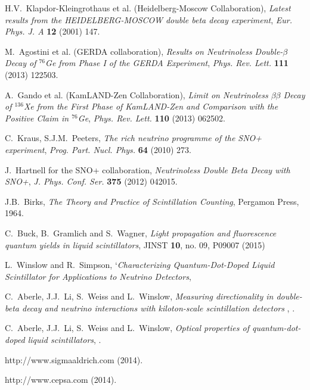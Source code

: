 \documentclass{JINST}
\begin{document}
\begin{thebibliography}{35}
H.V.~Klapdor-Kleingrothaus et al. (Heidelberg-Moscow Collaboration), \emph{Latest results from the HEIDELBERG-MOSCOW double beta decay experiment}, \emph{Eur. Phys. J. A} {\bf 12} (2001) 147.

M.~Agostini et al. (GERDA collaboration), \emph{Results on Neutrinoless Double-$\beta$ Decay of $^{76}$Ge from Phase I of the GERDA Experiment}, \emph{Phys. Rev. Lett.} {\bf 111} (2013) 122503. 

A.~Gando et al. (KamLAND-Zen Collaboration), \emph{Limit on Neutrinoless $\beta\beta$ Decay of $^{136}$Xe from the First Phase of KamLAND-Zen and Comparison with the Positive Claim in $^{76}$Ge}, \emph{Phys. Rev. Lett.} {\bf 110} (2013) 062502.

C.~Kraus, S.J.M.~Peeters, \emph{The rich neutrino programme of the SNO+ experiment}, \emph{Prog. Part. Nucl. Phys.} {\bf 64} (2010) 273.

J.~Hartnell for the SNO+ collaboration, \emph{Neutrinoless Double Beta Decay with SNO+}, \emph{J. Phys. Conf. Ser.} {\bf 375} (2012) 042015.

J.B.~Birks, \emph{The Theory and Practice of Scintillation Counting}, Pergamon Press, 1964.

  C.~Buck, B.~Gramlich and S.~Wagner,
  \emph{Light propagation and fluorescence quantum yields in liquid scintillators}, 
  JINST {\bf 10}, no. 09, P09007 (2015)

  L.~Winslow and R.~Simpson,
  `\emph{Characterizing Quantum-Dot-Doped Liquid Scintillator for Applications to Neutrino Detectors}, 

C.~Aberle, J.J.~Li, S.~Weiss and L.~Winslow, \emph{Measuring directionality in double-beta decay and neutrino interactions with kiloton-scale scintillation detectors }, .

C.~Aberle, J.J.~Li, S.~Weiss and L.~Winslow, \emph{Optical properties of quantum-dot-doped liquid scintillators}, .

http://www.sigmaaldrich.com (2014).

http://www.cepsa.com (2014). 


\end{thebibliography}
\end{document}
